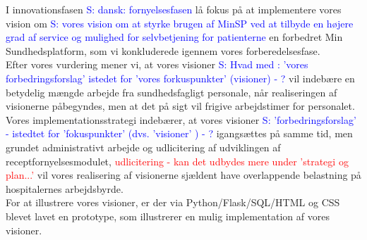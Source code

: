 I innovationsfasen 
\textcolor{blue}{S: dansk: fornyelsesfasen} lå fokus på at implementere  
vores vision om 
\textcolor{blue}{S: vores vision om at styrke brugen af MinSP ved at tilbyde en højere grad af service og mulighed for selvbetjening for patienterne}
en forbedret Min Sundhedsplatform, som vi konkluderede igennem vores forberedelsesfase.\\
Efter vores vurdering mener vi, at vores visioner 
\textcolor{blue}{S: Hvad med  : 'vores forbedringsforslag' istedet for 'vores forkuspunkter' (visioner) - ?}
 vil indebære en betydelig mængde arbejde fra sundhedsfagligt personale, når realiseringen af visionerne påbegyndes, men at det på sigt vil frigive arbejdstimer for personalet.\\
Vores implementationsstrategi indebærer, at vores visioner 
\textcolor{blue}{S: 'forbedringsforslag' - istedtet for 'fokuspunkter' (dvs. 'visioner' ) - ?}
 igangsættes på samme tid, men grundet administrativt arbejde og udlicitering af udviklingen af receptfornyelsesmodulet,
 \textcolor{red}{udlicitering - kan det udbydes mere under 'strategi og plan...'}
 vil vores realisering af visionerne sjældent have overlappende belastning på hospitalernes arbejdsbyrde.\\
For at illustrere vores visioner, er der via Python/Flask/SQL/HTML og CSS blevet lavet en prototype, som illustrerer en mulig implementation af vores visioner.\\
